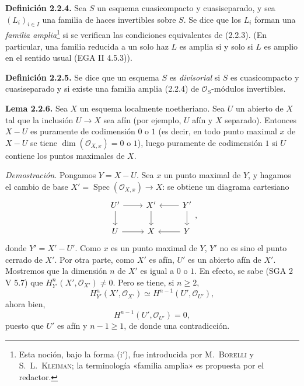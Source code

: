 \providecommand{\sisi}[2]{#2}

\textbf{Definición 2.2.4.} Sea $S$ un esquema cuasicompacto y cuasiseparado, y sea $(L_i)_{i\in I}$ una familia de haces invertibles sobre $S$. Se dice que los $L_i$ forman una \emph{familia amplia}\footnote{Esta noción, bajo la forma (i$'$), fue introducida por M.~\textsc{Borelli} y S.~L.~\textsc{Kleiman}; la terminología «familia amplia» es propuesta por el redactor.} si se verifican las condiciones equivalentes de (2.2.3). (En particular, una familia reducida a un solo haz $L$ es amplia si y solo si $L$ es amplio en el sentido usual (EGA II 4.5.3)).

\textbf{Definición 2.2.5.} Se dice que un esquema $S$ es \emph{divisorial} si $S$ es cuasicompacto y cuasiseparado y si existe una familia amplia (2.2.4) de $\mathcal O_S$-módulos invertibles.

\textbf{Lema 2.2.6.} Sea $X$ un esquema localmente noetheriano. Sea $U$ un abierto de $X$ tal que la inclusión $U\to X$ sea afín (por ejemplo, $U$ afín y $X$ separado). Entonces $X-U$ es puramente de codimensión $0$ o $1$ (es decir, en todo punto maximal $x$ de $X-U$ se tiene $\dim(\mathcal O_{X,x})=0$ o $1$), luego puramente de codimensión $1$ si $U$ contiene los puntos maximales de $X$.

\emph{Demostración.} Pongamos $Y=X-U$. Sea $x$ un punto maximal de $Y$, y hagamos el cambio de base $X'=\operatorname{Spec}(\mathcal O_{X,x})\to X$: se obtiene un diagrama cartesiano
\[
\begin{tikzcd}
U' \arrow[r] \arrow[d] & X' \arrow[d] & Y' \arrow[l] \arrow[d] \\
U \arrow[r] & X & Y \arrow[l]
\end{tikzcd},
\]
donde $Y'=\sisi{X'-U}{X'-U'}$. Como $x$ es un punto maximal de $Y$, $Y'$ no es sino el punto cerrado de $X'$. Por otra parte, como $X'$ es afín, $U'$ es un abierto afín de $X'$. Mostremos que la dimensión $n$ de $X'$ es igual a $0$ o $1$. En efecto, se sabe (SGA 2 V 5.7) que $H^n_{Y'}(X',\mathcal O_{X'})\ne0$. Pero se tiene, si $n\ge2$,
\[
H^n_{Y'}(X',\mathcal O_{X'})\simeq H^{n-1}(U',\mathcal O_{U'}),
\]
ahora bien,
\[
H^{n-1}(U',\mathcal O_{U'})=0,
\]
puesto que $U'$ es afín y $n-1\ge1$, de donde una contradicción.

